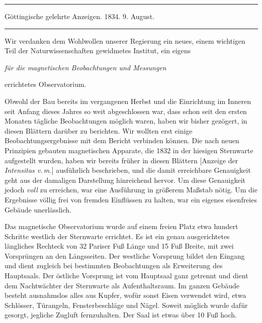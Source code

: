 \begin{center}
\hrule\vspace{2mm}
Göttingische gelehrte Anzeigen. 1834. 9. August.
\vspace{2mm}\hrule\vspace{5mm}
\end{center}
Wir verdanken dem Wohlwollen unserer Regierung ein neues, einem wichtigen Teil der Naturwissenschaften gewidmetes Institut, ein eigens
\begin{center}\itshape für die magnetischen Beobachtungen und Messungen\end{center}
\noindent errichtetes Observatorium.

Obwohl der Bau bereits im vergangenen Herbst und die Einrichtung im Inneren seit Anfang dieses Jahres so weit abgeschlossen war, dass schon seit den ersten Monaten tägliche Beobachtungen möglich waren, haben wir bisher gezögert, in diesen Blättern darüber zu berichten. Wir wollten erst einige Beobachtungsergebnisse mit dem Bericht verbinden können. Die nach neuen Prinzipien gebauten magnetischen Apparate, die 1832 in der hiesigen Sternwarte aufgestellt wurden, haben wir bereits früher in diesen Blättern [Anzeige der \textit{Intensitas v.\,m.}] ausführlich beschrieben, und die damit
erreichbare Genauigkeit geht aus der damaligen Darstellung hinreichend hervor. Um diese Genauigkeit jedoch \textit{voll} zu erreichen, war eine Ausführung in größerem Maßstab nötig. Um die Ergebnisse völlig frei von fremden Einflüssen zu halten, war ein eigenes eisenfreies Gebäude unerlässlich.

Das magnetische Observatorium wurde auf einem freien Platz etwa hundert Schritte westlich der Sternwarte errichtet. Es ist ein genau ausgerichtetes längliches Rechteck von 32 Pariser Fuß Länge und 15 Fuß Breite, mit zwei Vorsprüngen an den Längsseiten. Der westliche Vorsprung bildet den Eingang und dient zugleich bei bestimmten Beobachtungen als Erweiterung des Hauptsaals. Der östliche Vorsprung ist vom Hauptsaal ganz getrennt und dient dem Nachtwächter der Sternwarte als Aufenthaltsraum. Im ganzen Gebäude besteht ausnahmslos alles aus Kupfer, wofür sonst Eisen verwendet wird, etwa Schlösser, Türangeln, Fensterbeschläge und Nägel. Soweit möglich wurde dafür gesorgt, jegliche Zugluft fernzuhalten. Der Saal ist etwas über 10 Fuß hoch.

